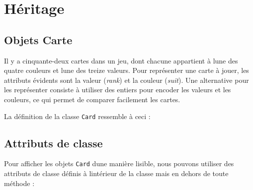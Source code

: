 \hypertarget{huxe9ritage}{%
\section{Héritage}\label{huxe9ritage}}

\hypertarget{objets-carte}{%
\subsection{Objets Carte}\label{objets-carte}}

Il y a cinquante-deux cartes dans un jeu, dont chacune appartient à
l\textquotesingle une des quatre couleurs et l\textquotesingle une des
treize valeurs. Pour représenter une carte à jouer, les attributs
évidents sont la valeur (\emph{rank}) et la couleur (\emph{suit}). Une
alternative pour les représenter consiste à utiliser des entiers pour
encoder les valeurs et les couleurs, ce qui permet de comparer
facilement les cartes.

La définition de la classe \texttt{Card} ressemble à ceci :

\begin{Shaded}
\begin{Highlighting}[]
\NormalTok{):}

     \NormalTok{(}\OperatorTok{=}\OperatorTok{=}\NormalTok{):}
        \OperatorTok{=}
        \OperatorTok{=}
\end{Highlighting}
\end{Shaded}

\hypertarget{attributs-de-classe}{%
\subsection{Attributs de classe}\label{attributs-de-classe}}

Pour afficher les objets \texttt{Card} d\textquotesingle une manière
lisible, nous pouvons utiliser des attributs de classe définis à
l\textquotesingle intérieur de la classe mais en dehors de toute méthode
:

